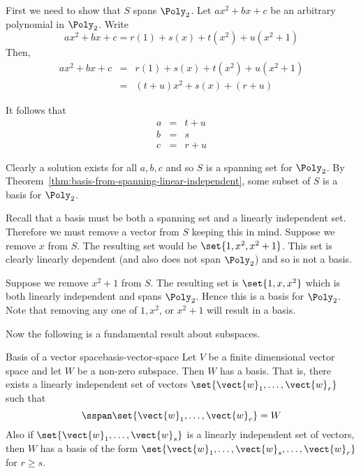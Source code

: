 \begin{solution}
First we need to show that $S$ spans $\Poly_2$. Let $ax^2 + bx + c$ be an arbitrary polynomial in $\Poly_2$. Write 
\[
ax^2 + bx + c = r(1) + s(x) + t(x^2) + u (x^2 + 1)
\]
Then,
\begin{eqnarray*}
ax^2 +bx + c &=& r(1) + s(x) + t(x^2) + u (x^2 + 1) \\
&=& (t+u) x^2 + s(x) + (r+u) 
\end{eqnarray*}

It follows that 
\begin{eqnarray*}
a &=& t + u \\
b &=& s \\
c &=& r + u 
\end{eqnarray*}

Clearly a solution exists for all $a,b,c$ and so $S$ is a spanning set for $\Poly_2$. By Theorem~\ref{thm:basis-from-spanning-linear-independent}, some subset of $S$ is a basis for $\Poly_2$. 

Recall that a basis must be both a spanning set and a linearly independent set.
Therefore we must remove a vector from $S$ keeping this in mind. Suppose we remove $x$ from $S$. The resulting set would be $\set{1, x^2, x^2 + 1 }$. This set is clearly linearly dependent (and also does not span $\Poly_2$) and so is not a basis. 

Suppose we remove $x^2 + 1$ from $S$. The resulting set is $\set{1, x, x^2 }$ which is both linearly independent and spans $\Poly_2$. Hence this is a basis for $\Poly_2$. Note that removing any one of $1, x^2$, or $x^2 + 1$ will result in a basis.
\end{solution}

Now the following is a fundamental result about subspaces.

\begin{theorem}{Basis of a vector space}{basis-vector-space}
Let $V$ be a finite dimensional vector space and let $W$ be
a non-zero subspace. Then $W$ has a basis. That is, there exists a linearly
independent set of vectors $\set{\vect{w}_{1},\ldots,\vect{w}_{r}} $
such that 
\begin{equation*}
\sspan\set{\vect{w}_{1},\ldots,\vect{w}_{r}} =W
\end{equation*}
Also if $\set{\vect{w}_{1},\ldots,\vect{w}_{s}} $ is a linearly
independent set of vectors, then $W$ has a basis of the form $\set{\vect{w}
_{1},\ldots,\vect{w}_{s},\ldots,\vect{w}_{r}} $ for $r\geq s$.
\end{theorem}

